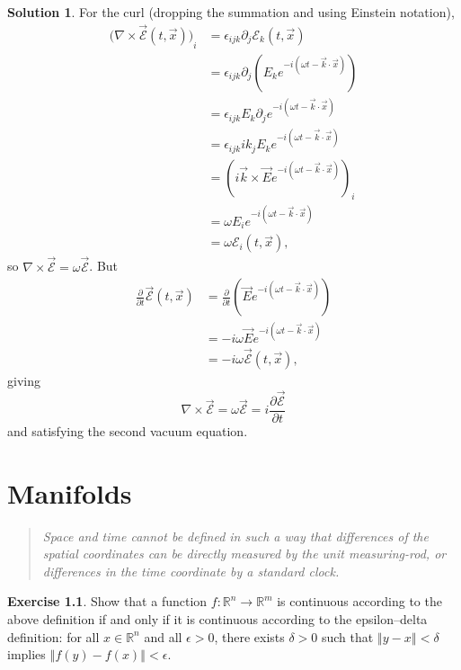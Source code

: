 \documentclass[11pt, a4paper]{report}
\theoremstyle{definition}
\newtheorem{exercise}{Exercise}[part]
\newtheorem{solution}{Solution}[part]
\newenvironment{ex}{\begin{exercise}}{\end{exercise}\pagebreak[1]}
\newenvironment{sol}{\begin{solution}}{\end{solution}\pagebreak[3]}
\newenvironment{epigraph}
    {\begin{quote}\small\itshape} %
    {\end{quote}\ignorespacesafterend\vspace{\parskip}}
\newcommand*{\norm}[1]{\ensuremath{\left\Vert#1\right\Vert}}
\begin{document}
\begin{sol}
For the curl (dropping the summation and using Einstein notation),
\begin{align*}
    {\bigl( \nabla \times \vec{\mathcal{E}}(t, \vec{x}) \bigr)}_i &= \epsilon_{ijk} \partial_j \mathcal{E}_k(t, \vec{x}) \\
        &= \epsilon_{ijk} \partial_j \left(E_k e^{-i(\omega t - \vec{k} \cdot \vec{x})} \right) \\
        &= \epsilon_{ijk} E_k \partial_j e^{-i(\omega t - \vec{k} \cdot \vec{x})} \\
        &= \epsilon_{ijk}i k_j E_k e^{-i(\omega t - \vec{k} \cdot \vec{x})} \\
        &= {\left(i \vec{k} \times \vec{E} e^{-i(\omega t - \vec{k} \cdot \vec{x})} \right)}_i \\
        &= \omega E_i e^{-i(\omega t - \vec{k} \cdot \vec{x})} \\
        &= \omega \mathcal{E}_i(t, \vec{x}),
\end{align*}
so $\nabla \times \vec{\mathcal{E}} = \omega \vec{\mathcal{E}}$.
But
\begin{align*}
    \frac{\partial}{\partial t} \vec{\mathcal{E}}(t, \vec{x}) &= \frac{\partial}{\partial t} \left(\vec{E} e^{-i(\omega t - \vec{k} \cdot \vec{x})} \right) \\
        &= -i \omega \vec{E} e^{-i(\omega t - \vec{k} \cdot \vec{x})} \\
        &= -i \omega \vec{\mathcal{E}}(t, \vec{x}),
\end{align*}
giving
\[
    \nabla \times \vec{\mathcal{E}} = \omega \vec{\mathcal{E}} = i \frac{\partial \vec{\mathcal{E}}}{\partial t}
\]
and satisfying the second vacuum equation.

\end{sol}

\chapter{Manifolds}

\begin{epigraph}
    Space and time cannot be defined in such a way that differences of the spatial coordinates can be directly measured by the unit measuring-rod, or differences in the time coordinate by a standard clock.
\end{epigraph}

\begin{ex}

Show that a function $f: \mathbb{R}^n \to \mathbb{R}^m$ is continuous according to the above definition if and only if it is continuous according to the epsilon--delta definition: for all $x \in \mathbb{R}^n$ and all $\epsilon > 0$, there exists $\delta > 0$ such that $\norm{y - x} < \delta$ implies $\norm{f(y) - f(x)} < \epsilon$.

\end{ex}
\end{document}
